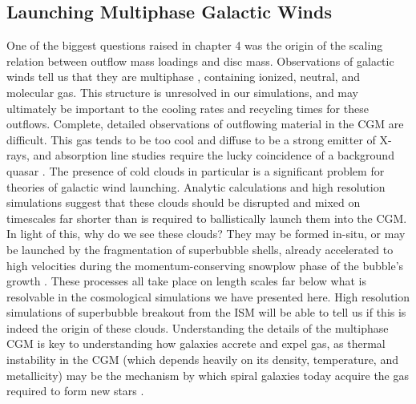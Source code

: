 \subsection{Launching Multiphase Galactic Winds}
One of the biggest questions raised in chapter 4 was the origin of the scaling
relation between outflow mass loadings and disc mass.  Observations of galactic
winds tell us that they are multiphase \citep{Stark1984,Wakker1997}, containing
ionized, neutral, and molecular gas.  This structure is unresolved in our
simulations, and may ultimately be important to the cooling rates and recycling
times for these outflows.  Complete, detailed observations of outflowing
material in the CGM are difficult. This gas tends to be too cool and diffuse to
be a strong emitter of X-rays, and absorption line studies require the lucky
coincidence of a background quasar \citep{Weiner2009}.  The presence of cold
clouds in particular is a significant problem for theories of galactic wind
launching.  Analytic calculations and high resolution simulations suggest that
these clouds should be disrupted and mixed on timescales far shorter than is
required to ballistically launch them into the CGM.  In light of this, why do we
see these clouds?  They may be formed in-situ, or may be launched by the
fragmentation of superbubble shells, already accelerated to high velocities
during the momentum-conserving snowplow phase of the bubble's growth
\citet{Lagos2013}.  These processes all take place on length scales far below
what is resolvable in the cosmological simulations we have presented here.  High
resolution simulations of superbubble breakout from the ISM will be able to tell
us if this is indeed the origin of these clouds.  Understanding the details of
the multiphase CGM is key to understanding how galaxies accrete and expel gas,
as thermal instability in the CGM (which depends heavily on its density,
temperature, and metallicity) may be the mechanism by which spiral galaxies
today acquire the gas required to form new stars \citep{Marasco2012}.  

